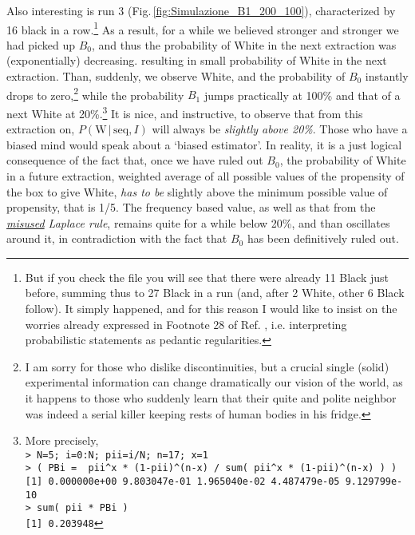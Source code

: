 \documentclass[11pt]{article}
\begin{document}
Also interesting is run 3 (Fig.\,\ref{fig:Simulazione_B1_200_100}),
characterized by 16 black in a row.\footnote{But if you check the file
you will see that there were already 11 Black just before, 
summing thus to 27 Black in a run (and, after 2 White, 
other 6 Black follow). It simply happened, and 
for this reason I would like to insist on the worries already
expressed in Footnote 28 of Ref. \cite{ME2016}, i.e. interpreting 
probabilistic statements as pedantic regularities. 
} As a result, for a while we believed stronger and stronger
we had picked up $B_0$, and thus the probability of White
in the next extraction was (exponentially) decreasing. 
resulting in small probability
of White in the next extraction. Than, suddenly,  
we observe White, and  the probability of $B_0$ instantly drops 
to zero,\footnote{I am sorry for those who dislike discontinuities,
but a crucial single (solid) experimental information 
can change dramatically our vision of the world, as it happens
to those who suddenly learn that their quite and polite neighbor was 
indeed a serial killer keeping rests of human bodies in his fridge.} 
while the probability $B_1$ jumps practically at 100\% 
and that of a next White at 20\%.\footnote{More precisely,\\
\verb|> N=5; i=0:N; pii=i/N; n=17; x=1|\\
\verb|> ( PBi =  pii^x * (1-pii)^(n-x) / sum( pii^x * (1-pii)^(n-x) ) )|\\
\verb|[1] 0.000000e+00 9.803047e-01 1.965040e-02 4.487479e-05 9.129799e-10|\\
\verb|> sum( pii * PBi )|\\
\verb|[1] 0.203948|
}
It is nice, and instructive, to observe that from this extraction
on, $P(\mbox{W}\,|\,\mbox{seq},I)$ will always be 
{\em slightly above 20\%}. Those who have a biased mind would
 speak about a `biased estimator'. In reality, it is 
a just logical consequence of the fact that, once we have ruled out $B_0$, 
the probability of White in a future extraction, 
weighted average of all possible values of the propensity
of the box to give White,  {\em has to be} slightly 
above the minimum possible value of propensity, that  
is 1/5. The frequency based value, as well as that from  the
{\em \underline{misused} Laplace rule}, remains quite for a while 
below 20\%, and than oscillates around it, in contradiction
with the fact that $B_0$ has been definitively ruled out.  
\end{document}
